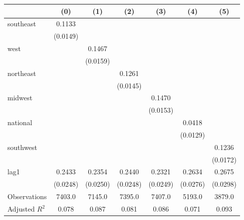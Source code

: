 \begin{tabular}{lcccccc}
\toprule
 & (0) & (1) & (2) & (3) & (4) & (5) \\
\midrule
southeast & 0.1133 &  &  &  &  &  \\
\vspace{0.2cm}
 & (0.0149) &  &  &  &  &  \\
west &  & 0.1467 &  &  &  &  \\
\vspace{0.2cm}
 &  & (0.0159) &  &  &  &  \\
northeast &  &  & 0.1261 &  &  &  \\
\vspace{0.2cm}
 &  &  & (0.0145) &  &  &  \\
midwest &  &  &  & 0.1470 &  &  \\
\vspace{0.2cm}
 &  &  &  & (0.0153) &  &  \\
national &  &  &  &  & 0.0418 &  \\
\vspace{0.2cm}
 &  &  &  &  & (0.0129) &  \\
southwest &  &  &  &  &  & 0.1236 \\
\vspace{0.2cm}
 &  &  &  &  &  & (0.0172) \\
lag1 & 0.2433 & 0.2354 & 0.2440 & 0.2321 & 0.2634 & 0.2675 \\
\vspace{0.2cm}
 & (0.0248) & (0.0250) & (0.0248) & (0.0249) & (0.0276) & (0.0298) \\
\midrule
Observations & 7403.0 & 7145.0 & 7395.0 & 7407.0 & 5193.0 & 3879.0 \\
Adjusted $R^2$ & 0.078 & 0.087 & 0.081 & 0.086 & 0.071 & 0.093 \\
\bottomrule
\end{tabular}
